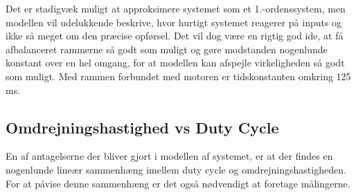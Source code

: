 Det er stadigvæk muligt at approksimere systemet som et 1.-ordenssystem, men modellen vil udelukkende beskrive, hvor hurtigt systemet reagerer på inputs og ikke så meget om den præcise opførsel. Det vil dog være en rigtig god ide, at få afbalanceret rammerne så godt som muligt og gøre modstanden nogenlunde konstant over en hel omgang, for at modellen kan afspejle virkeligheden så godt som muligt. Med rammen forbundet med motoren er tidskonstanten omkring 125 ms.

\subsection{Omdrejningshastighed vs Duty Cycle}

En af antagelserne der bliver gjort i modellen af systemet, er at der findes en nogenlunde lineær sammenhæng imellem duty cycle og omdrejningshastigheden. For at påvise denne sammenhæng er det også nødvendigt at foretage målingerne. 